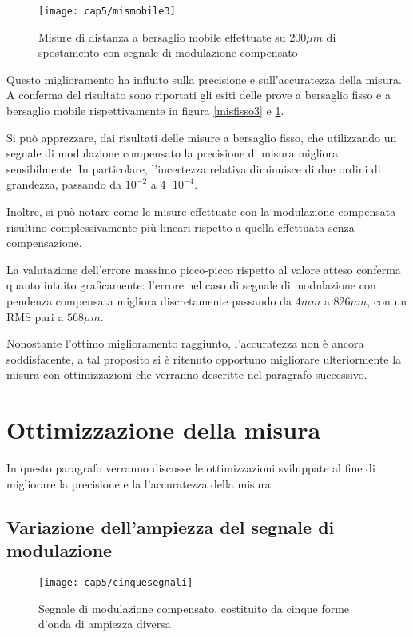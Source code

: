 \begin{figure}  
  \begin{center}
    \texttt{[image: cap5/mismobile3]}
    \caption{Misure di distanza a bersaglio mobile effettuate su $200\mu m$ di spostamento con segnale di modulazione compensato}
    \label{mismobile3}
  \end{center}
\end{figure}

Questo miglioramento ha influito sulla precisione e sull'accuratezza della misura. A conferma del risultato sono riportati gli esiti delle prove a bersaglio fisso e a bersaglio mobile rispettivamente in figura \ref{misfisso3} e \ref{mismobile3}.

Si può apprezzare, dai risultati delle misure a bersaglio fisso, che utilizzando un segnale di modulazione compensato la precisione di misura migliora sensibilmente. In particolare, l'incertezza relativa diminuisce di due ordini di grandezza, passando da $10^{-2}$ a $4 \cdot 10^{-4}$.

Inoltre, si può notare come le misure effettuate con la modulazione compensata risultino complessivamente più lineari rispetto a quella effettuata senza compensazione.

La valutazione dell'errore massimo picco-picco rispetto al valore atteso conferma quanto intuito graficamente: l'errore nel caso di segnale di modulazione con pendenza compensata migliora discretamente passando da $4mm$ a $826 \mu m$, con un RMS pari a $568 \mu m$.

Nonostante l'ottimo miglioramento raggiunto, l'accuratezza non è ancora soddisfacente, a tal proposito si è ritenuto opportuno migliorare ulteriormente la misura con ottimizzazioni che verranno descritte nel paragrafo successivo.

\section{Ottimizzazione della misura}
In questo paragrafo verranno discusse le ottimizzazioni sviluppate al fine di migliorare la precisione e la l'accuratezza della misura.

\subsection{Variazione dell'ampiezza del segnale di modulazione}
\begin{figure}  
  \begin{center}
    \texttt{[image: cap5/cinquesegnali]}
    \caption{Segnale di modulazione compensato, costituito da cinque forme d'onda di ampiezza diversa}
    \label{cinquesegnali}
  \end{center}
\end{figure}

